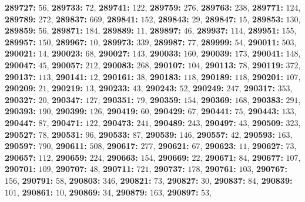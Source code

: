 \textsf{\bfseries 289727:} $56$, \textsf{\bfseries 289733:} $72$, \textsf{\bfseries 289741:} $122$, \textsf{\bfseries 289759:} $276$, \textsf{\bfseries 289763:} $238$, \textsf{\bfseries 289771:} $124$, \textsf{\bfseries 289789:} $272$, \textsf{\bfseries 289837:} $669$, \textsf{\bfseries 289841:} $152$, \textsf{\bfseries 289843:} $29$, \textsf{\bfseries 289847:} $15$, \textsf{\bfseries 289853:} $130$, \textsf{\bfseries 289859:} $56$, \textsf{\bfseries 289871:} $184$, \textsf{\bfseries 289889:} $11$, \textsf{\bfseries 289897:} $46$, \textsf{\bfseries 289937:} $114$, \textsf{\bfseries 289951:} $155$, \textsf{\bfseries 289957:} $150$, \textsf{\bfseries 289967:} $10$, \textsf{\bfseries 289973:} $339$, \textsf{\bfseries 289987:} $77$, \textsf{\bfseries 289999:} $54$, \textsf{\bfseries 290011:} $503$, \textsf{\bfseries 290021:} $14$, \textsf{\bfseries 290023:} $68$, \textsf{\bfseries 290027:} $143$, \textsf{\bfseries 290033:} $160$, \textsf{\bfseries 290039:} $173$, \textsf{\bfseries 290041:} $148$, \textsf{\bfseries 290047:} $45$, \textsf{\bfseries 290057:} $212$, \textsf{\bfseries 290083:} $268$, \textsf{\bfseries 290107:} $104$, \textsf{\bfseries 290113:} $78$, \textsf{\bfseries 290119:} $372$, \textsf{\bfseries 290137:} $113$, \textsf{\bfseries 290141:} $12$, \textsf{\bfseries 290161:} $38$, \textsf{\bfseries 290183:} $118$, \textsf{\bfseries 290189:} $118$, \textsf{\bfseries 290201:} $107$, \textsf{\bfseries 290209:} $21$, \textsf{\bfseries 290219:} $13$, \textsf{\bfseries 290233:} $43$, \textsf{\bfseries 290243:} $52$, \textsf{\bfseries 290249:} $247$, \textsf{\bfseries 290317:} $353$, \textsf{\bfseries 290327:} $20$, \textsf{\bfseries 290347:} $127$, \textsf{\bfseries 290351:} $79$, \textsf{\bfseries 290359:} $154$, \textsf{\bfseries 290369:} $168$, \textsf{\bfseries 290383:} $291$, \textsf{\bfseries 290393:} $190$, \textsf{\bfseries 290399:} $126$, \textsf{\bfseries 290419:} $60$, \textsf{\bfseries 290429:} $67$, \textsf{\bfseries 290441:} $75$, \textsf{\bfseries 290443:} $133$, \textsf{\bfseries 290447:} $87$, \textsf{\bfseries 290471:} $122$, \textsf{\bfseries 290473:} $241$, \textsf{\bfseries 290489:} $243$, \textsf{\bfseries 290497:} $43$, \textsf{\bfseries 290509:} $323$, \textsf{\bfseries 290527:} $78$, \textsf{\bfseries 290531:} $96$, \textsf{\bfseries 290533:} $87$, \textsf{\bfseries 290539:} $146$, \textsf{\bfseries 290557:} $42$, \textsf{\bfseries 290593:} $163$, \textsf{\bfseries 290597:} $790$, \textsf{\bfseries 290611:} $508$, \textsf{\bfseries 290617:} $277$, \textsf{\bfseries 290621:} $67$, \textsf{\bfseries 290623:} $11$, \textsf{\bfseries 290627:} $73$, \textsf{\bfseries 290657:} $112$, \textsf{\bfseries 290659:} $224$, \textsf{\bfseries 290663:} $154$, \textsf{\bfseries 290669:} $22$, \textsf{\bfseries 290671:} $84$, \textsf{\bfseries 290677:} $107$, \textsf{\bfseries 290701:} $109$, \textsf{\bfseries 290707:} $48$, \textsf{\bfseries 290711:} $721$, \textsf{\bfseries 290737:} $178$, \textsf{\bfseries 290761:} $103$, \textsf{\bfseries 290767:} $156$, \textsf{\bfseries 290791:} $58$, \textsf{\bfseries 290803:} $346$, \textsf{\bfseries 290821:} $73$, \textsf{\bfseries 290827:} $30$, \textsf{\bfseries 290837:} $84$, \textsf{\bfseries 290839:} $101$, \textsf{\bfseries 290861:} $10$, \textsf{\bfseries 290869:} $34$, \textsf{\bfseries 290879:} $163$, \textsf{\bfseries 290897:} $53$, 
